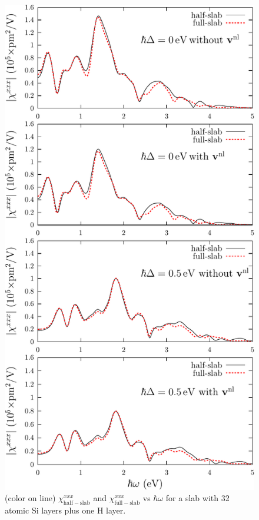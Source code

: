\documentclass[floatfix,prb,aps,superscriptaddress,showpacs,11pt,preprint,letterpaper]{revtex4}
\begin{document}
\begin{figure}
\centering 
\includegraphics[scale=.8]{fig4}
\caption{(color on line) 
$\chi^{xxx}_{\mathrm{half-slab}}$
and 
$\chi^{xxx}_{\mathrm{full-slab}}$
vs $\hbar\omega$ for a slab with 32 
atomic Si layers plus one H layer. 
\label{fig2}} 
\end{figure}
\end{document}
